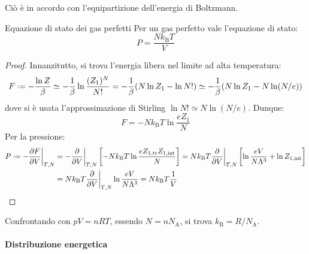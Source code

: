 Ciò è in accordo con l'equipartizione dell'energia di Boltzmann.

\begin{theorem}{Equazione di stato dei gas perfetti}{}
	Per un gas perfetto vale l'equazione di stato:
	\begin{equation}
		P = \frac{N k_\text{B} T}{V}
	\end{equation}

	\tcblower

	\begin{proof}
		Innanzitutto, si trova l'energia libera nel limite ad alta temperatura:
		\begin{equation*}
			F \defeq - \frac{\ln Z}{\beta} \simeq - \frac{1}{\beta} \ln \frac{(Z_1)^N}{N!} = - \frac{1}{\beta} (N \ln Z_1 - \ln N!) \simeq - \frac{1}{\beta} (N \ln Z_1 - N \ln (N/e))
		\end{equation*}
		dove si è usata l'approssimazione di Stirling $ \ln N! \simeq N \ln (N/e) $. Dunque:
		\begin{equation}
			F = - N k_\text{B} T \ln \frac{e Z_1}{N}
		\end{equation}
		Per la pressione:
		\begin{equation*}
			\begin{split}
				P \defeq - \frac{\pa F}{\pa V} \bigg\vert_{T,N}
				& = - \frac{\pa}{\pa V} \bigg\vert_{T,N} \left[ - N k_\text{B} T \ln \frac{e Z_{1,\text{tr}} Z_{1,\text{int}}}{N} \right] = N k_\text{B} T \frac{\pa}{\pa V} \bigg\vert_{T,N} \left[ \ln \frac{eV}{N \Lambda^3} + \ln Z_{1,\text{int}} \right] \\
				& = N k_\text{B} T \frac{\pa}{\pa V}\bigg\vert_{T,N} \ln \frac{eV}{N \Lambda^3} = N k_\text{B} T \frac{1}{V}
			\end{split}
		\end{equation*}
	\end{proof}
\end{theorem}

Confrontando con $ pV = nRT $, essendo $ N = n N_\text{A} $, si trova $ k_\text{B} = R / N_\text{A} $.

\paragraph{Distribuzione energetica}

